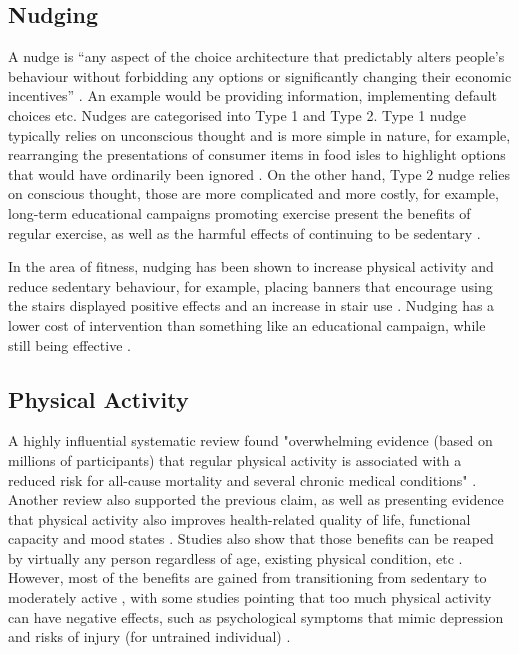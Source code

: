 \subsection{Nudging}
A nudge is “any aspect of the choice architecture that predictably alters people's behaviour without forbidding any options or significantly changing their economic incentives” \cite{nudgeDef}. An example would be providing information, implementing default choices etc. Nudges are categorised into Type 1 and Type 2. Type 1 nudge typically relies on unconscious thought and is more simple in nature, for example, rearranging the presentations of consumer items in food isles to highlight options that would have ordinarily been ignored \cite{NudgeCritical}. On the other hand, Type 2 nudge relies on conscious thought, those are more complicated and more costly, for example, long-term educational campaigns promoting exercise present the benefits of regular exercise, as well as the harmful effects of continuing to be sedentary \cite{NudgeCritical}.  

In the area of fitness, nudging has been shown to increase physical activity and reduce sedentary behaviour, for example, placing banners that encourage using the stairs displayed positive effects and an increase in stair use \cite{FORBERGER2022106922, Forberger2019}. Nudging has a lower cost of intervention than something like an educational campaign, while still being effective \cite{nudgeCost}. 

\subsection{Physical Activity}
A highly influential systematic review found "overwhelming evidence (based on millions of participants) that regular physical activity is associated with a reduced risk for all-cause mortality and several chronic medical conditions" \cite{Warburton2017Health}. Another review also supported the previous claim, as well as presenting evidence that physical activity also improves health-related quality of life, functional capacity and mood states \cite{Penedo2005Exercise}. Studies also show that those benefits can be reaped by virtually any person regardless of age, existing physical condition, etc \cite{Penedo2005Exercise, Warburton2017Health}. However, most of the benefits are gained from transitioning from sedentary to moderately active \cite{Powell2011Physical}, with some studies pointing that too much physical activity can have negative effects, such as psychological symptoms that mimic depression \cite{Paluska2000Physical} and risks of injury (for untrained individual) \cite{Melzer2004Physical}.


